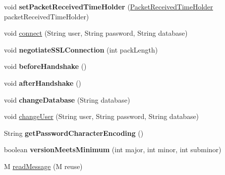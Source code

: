 \begin{DoxyCompactItemize}
void {\bfseries set\+Packet\+Received\+Time\+Holder} (\mbox{\hyperlink{interfacecom_1_1mysql_1_1cj_1_1protocol_1_1_packet_received_time_holder}{Packet\+Received\+Time\+Holder}} packet\+Received\+Time\+Holder)
\item 
void \mbox{\hyperlink{interfacecom_1_1mysql_1_1cj_1_1protocol_1_1_protocol_a62fc4a0bb330ef36eb91217c33b36ab8}{connect}} (String user, String password, String database)
\item 
\mbox{\label{interfacecom_1_1mysql_1_1cj_1_1protocol_1_1_protocol_adb74cf66c1d6f69ff114d3d6c45db6dd}} 
void {\bfseries negotiate\+S\+S\+L\+Connection} (int pack\+Length)
\item 
\mbox{\label{interfacecom_1_1mysql_1_1cj_1_1protocol_1_1_protocol_ab775cf8ac0a9bec0df8c4a473c804ae8}} 
void {\bfseries before\+Handshake} ()
\item 
\mbox{\label{interfacecom_1_1mysql_1_1cj_1_1protocol_1_1_protocol_ab5abac8e23590e55ada2b133ce963a5c}} 
void {\bfseries after\+Handshake} ()
\item 
\mbox{\label{interfacecom_1_1mysql_1_1cj_1_1protocol_1_1_protocol_a02558c9b17a492adb2e5b9cb0fb82778}} 
void {\bfseries change\+Database} (String database)
\item 
void \mbox{\hyperlink{interfacecom_1_1mysql_1_1cj_1_1protocol_1_1_protocol_ae7c8eae149543f5b736a905864b8c1f2}{change\+User}} (String user, String password, String database)
\item 
\mbox{\label{interfacecom_1_1mysql_1_1cj_1_1protocol_1_1_protocol_a60c0f5b5a210c088b9bf761e828031b1}} 
String {\bfseries get\+Password\+Character\+Encoding} ()
\item 
\mbox{\label{interfacecom_1_1mysql_1_1cj_1_1protocol_1_1_protocol_ace7057295ed6873e77e7998bbf5fa082}} 
boolean {\bfseries version\+Meets\+Minimum} (int major, int minor, int subminor)
\item 
M \mbox{\hyperlink{interfacecom_1_1mysql_1_1cj_1_1protocol_1_1_protocol_a5eb63441ad97f1ba2c97b4785c7ca16d}{read\+Message}} (M reuse)

\end{DoxyCompactItemize}
